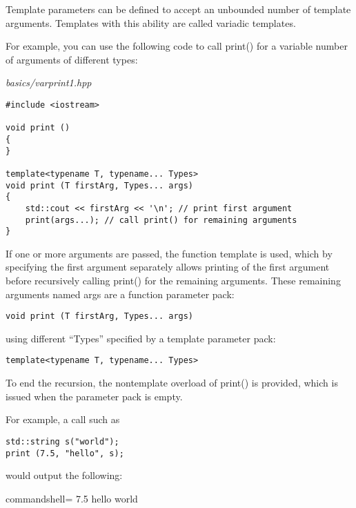 

Template parameters can be defined to accept an unbounded number of template arguments. Templates with this ability are called variadic templates.


For example, you can use the following code to call print() for a variable number of arguments of different types:

\noindent
\textit{basics/varprint1.hpp}
\begin{lstlisting}[style=styleCXX]
#include <iostream>

void print ()
{
}

template<typename T, typename... Types>
void print (T firstArg, Types... args)
{
	std::cout << firstArg << '\n'; // print first argument
	print(args...); // call print() for remaining arguments
}
\end{lstlisting}

If one or more arguments are passed, the function template is used, which by specifying the first argument separately allows printing of the first argument before recursively calling print() for the remaining arguments. These remaining arguments named args are a function parameter pack:

\begin{lstlisting}[style=styleCXX]
void print (T firstArg, Types... args)
\end{lstlisting}

using different “Types” specified by a template parameter pack:

\begin{lstlisting}[style=styleCXX]
template<typename T, typename... Types>
\end{lstlisting}

To end the recursion, the nontemplate overload of print() is provided, which is issued when the parameter pack is empty.

For example, a call such as

\begin{lstlisting}[style=styleCXX]
std::string s("world");
print (7.5, "hello", s);
\end{lstlisting}

would output the following:

\begin{tcblisting}{commandshell={}}
7.5
hello
world
\end{tcblisting}

